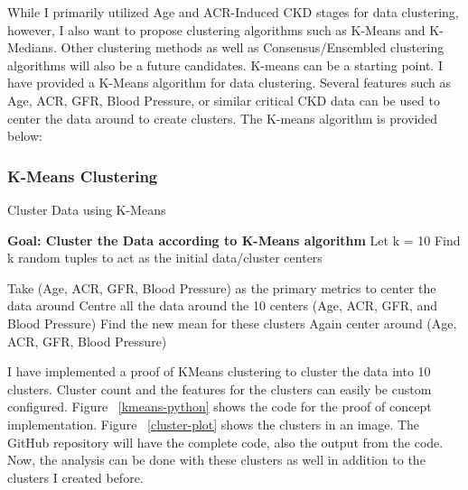 \flushleft \justifying While I primarily utilized Age and ACR-Induced CKD stages for data clustering, however, I also want to propose clustering algorithms such as K-Means and K-Medians. Other clustering methods as well as Consensus/Ensembled clustering algorithms will also be a future candidates. K-means can be a starting point. I have provided a K-Means algorithm for data clustering. Several features such as Age, ACR, GFR, Blood Pressure, or similar critical CKD data can be used to center the data around to create clusters. The K-means algorithm is provided below:

\subsubsection{K-Means Clustering}
\renewcommand{\labelitemi}{$$}
\begin{algorithm}
\caption{Cluster Data using K-Means}
\begin{algorithmic}
\STATE \textbf{Goal: Cluster the Data according to K-Means algorithm}\vspace{0.10cm}
\STATE Let k = 10
\STATE Find k random tuples to act as the initial data/cluster centers
\vspace{0.10cm}

\STATE Take (Age, ACR, GFR, Blood Pressure) as the primary metrics to center the data around
\STATE Centre all the data around the 10 centers (Age, ACR, GFR, and Blood Pressure)
\STATE Find the new mean for these clusters
\STATE Again center around (Age, ACR, GFR, Blood Pressure)

\ENDWHILE

\vspace{0.10cm}
\end{algorithmic}
\end{algorithm}


\flushleft \justifying I have implemented a proof of KMeans clustering to cluster the data into 10 clusters. Cluster count and the features for the clusters can easily be custom configured. Figure ~\ref{kmeans-python} shows the code for the proof of concept implementation. Figure ~\ref{cluster-plot} shows the clusters in an image. The GitHub repository will have the complete code, also the output from the code. Now, the analysis can be done with these clusters as well in addition to the clusters I created before.

